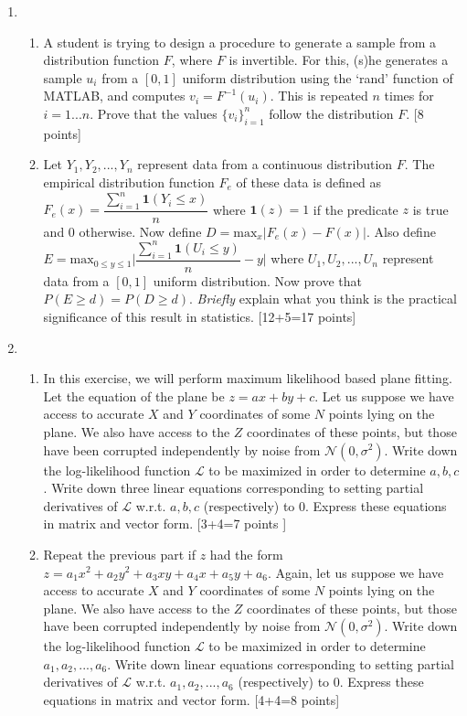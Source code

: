 \documentclass[11pt]{article}
\begin{document}
\begin{enumerate}
\item \begin{enumerate}
\item A student is trying to design a procedure to generate a sample from a distribution function $F$, where $F$ is invertible. For this, (s)he generates a sample $u_i$ from a $[0,1]$ uniform distribution using the `rand' function of MATLAB, and computes $v_i = F^{-1}(u_i)$. This is repeated $n$ times for $i = 1 ... n$. Prove that the values $\{v_i\}_{i=1}^n$  follow the distribution $F$. \textsf{[8 points]}
\item Let $Y_1, Y_2, ..., Y_n$ represent data from a continuous distribution $F$. The empirical distribution function $F_e$ of these data is defined as $F_e(x) = \dfrac{\sum_{i=1}^n \mathbf{1}(Y_i \leq x)}{n}$ where $\mathbf{1}(z) = 1$ if the predicate $z$ is true and 0 otherwise. Now define $D = \textrm{max}_x | F_e(x)-F(x) |$. Also define $E = \textrm{max}_{0 \leq y \leq 1} \Big|\dfrac{\sum_{i=1}^n \mathbf{1}(U_i \leq y)}{n} - y \Big|$ where $U_1, U_2, ..., U_n$ represent data from a $[0,1]$ uniform distribution. Now prove that $P(E \geq d) = P(D \geq d)$. \emph{Briefly} explain what you think is the practical significance of this result in statistics. \textsf{[12+5=17 points]}
\end{enumerate}

\item 
\begin{enumerate}
\item In this exercise, we will perform maximum likelihood based plane fitting. Let the equation of the plane be $z = ax + by + c$. Let us suppose we have access to accurate $X$ and $Y$ coordinates of some $N$ points lying on the plane. We also have access to the $Z$ coordinates of these points, but those have been corrupted independently by noise from $\mathcal{N}(0,\sigma^2)$. Write down the log-likelihood function $\mathcal{L}$ to be maximized in order to determine $a,b,c$. Write down three linear equations corresponding to setting partial derivatives of $\mathcal{L}$ w.r.t. $a,b,c$ (respectively) to 0. Express these equations in matrix and vector form. \textsf{[3+4=7 points ]} \\

\item Repeat the previous part if $z$ had the form $z = a_1 x^2 + a_2 y^2 + a_3 xy + a_4 x + a_5 y + a_6$. Again, let us suppose we have access to accurate $X$ and $Y$ coordinates of some $N$ points lying on the plane. We also have access to the $Z$ coordinates of these points, but those have been corrupted independently by noise from $\mathcal{N}(0,\sigma^2)$. Write down the log-likelihood function $\mathcal{L}$ to be maximized in order to determine $a_1,a_2,...,a_6$. Write down linear equations corresponding to setting partial derivatives of $\mathcal{L}$ w.r.t. $a_1,a_2,...,a_6$ (respectively) to 0. Express these equations in matrix and vector form. \textsf{[4+4=8 points]}\\


\end{enumerate}
\end{enumerate}
\end{document}
